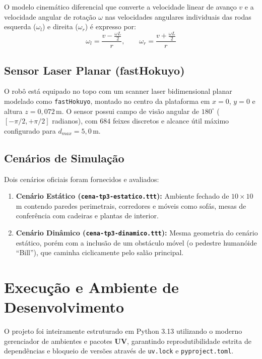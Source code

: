 \documentclass[11pt,a4paper]{article}
\begin{document}
O modelo cinemático diferencial que converte a velocidade linear de avanço $v$ e a velocidade angular de rotação $\omega$ nas velocidades angulares individuais das rodas esquerda ($\omega_l$) e direita ($\omega_r$) é expresso por:
\begin{equation}
    \omega_l = \frac{v - \frac{\omega L}{2}}{r}, \qquad \omega_r = \frac{v + \frac{\omega L}{2}}{r}
    \label{eq:differential_kinematics}
\end{equation}

\subsection{Sensor Laser Planar (fastHokuyo)}
O robô está equipado no topo com um scanner laser bidimensional planar modelado como \texttt{fastHokuyo}, montado no centro da plataforma em $x=0$, $y=0$ e altura $z = 0{,}072$\,m. O sensor possui campo de visão angular de $180^\circ$ ($[-\pi/2, +\pi/2]$ radianos), com $684$ feixes discretos e alcance útil máximo configurado para $d_{max} = 5{,}0$\,m.

\subsection{Cenários de Simulação}
Dois cenários oficiais foram fornecidos e avaliados:
\begin{enumerate}
    \item \textbf{Cenário Estático (\texttt{cena-tp3-estatico.ttt}):} Ambiente fechado de $10 \times 10$\,m contendo paredes perimetrais, corredores e móveis como sofás, mesas de conferência com cadeiras e plantas de interior.
    \item \textbf{Cenário Dinâmico (\texttt{cena-tp3-dinamico.ttt}):} Mesma geometria do cenário estático, porém com a inclusão de um obstáculo móvel (o pedestre humanóide ``Bill''), que caminha ciclicamente pelo salão principal.
\end{enumerate}

\section{Execução e Ambiente de Desenvolvimento}

O projeto foi inteiramente estruturado em Python 3.13 utilizando o moderno gerenciador de ambientes e pacotes \textbf{UV}, garantindo reprodutibilidade estrita de dependências e bloqueio de versões através de \texttt{uv.lock} e \texttt{pyproject.toml}.
\end{document}
